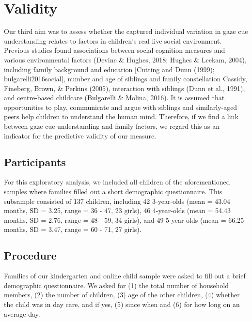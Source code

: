 \documentclass[
  man,floatsintext]{apa6}
\begin{document}
\hypertarget{validity}{%
\section{Validity}\label{validity}}

Our third aim was to assess whether the captured individual variation in gaze cue understanding relates to factors in children's real live social environment. Previous studies found associations between social cognition measures and various environmental factors (Devine \& Hughes, 2018; Hughes \& Leekam, 2004), including family background and education {[}Cutting and Dunn (1999); bulgarelli2016social{]}, number and age of siblings and family constellation Cassidy, Fineberg, Brown, \& Perkins (2005), interaction with siblings (Dunn et al., 1991), and centre-based childcare (Bulgarelli \& Molina, 2016). It is assumed that opportunities to play, communicate and argue with siblings and similarly-aged peers help children to understand the human mind. Therefore, if we find a link between gaze cue understanding and family factors, we regard this as an indicator for the predictive validity of our measure.

\hypertarget{participants-2}{%
\subsection{Participants}\label{participants-2}}

For this exploratory analysis, we included all children of the aforementioned samples where families filled out a short demographic questionnaire. This subsample consisted of
137 children, including
42 3-year-olds
(mean = 43.04 months,
SD = 3.25,
range = 36
- 47,
23 girls),
46 4-year-olds
(mean = 54.43 months,
SD = 2.76,
range = 48
- 59,
34 girls),
and 49 5-year-olds
(mean = 66.25 months,
SD = 3.47,
range = 60
- 71,
27 girls).

\hypertarget{procedure-2}{%
\subsection{Procedure}\label{procedure-2}}

Families of our kindergarten and online child sample were asked to fill out a brief demographic questionnaire. We asked for (1) the total number of household members, (2) the number of children, (3) age of the other children, (4) whether the child was in day care, and if yes, (5) since when and (6) for how long on an average day.
\end{document}
